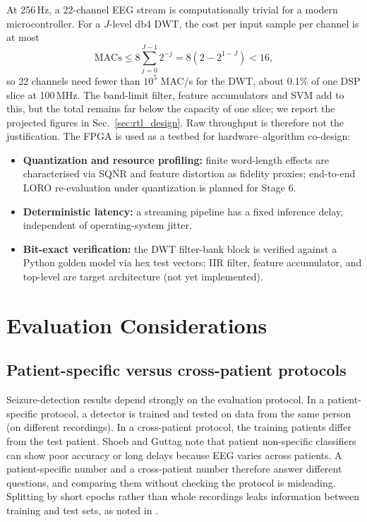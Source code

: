 \documentclass[10pt,twocolumn,letterpaper]{article}
\begin{document}
At 256\,Hz, a 22-channel EEG stream is computationally trivial for a
modern microcontroller. For a $J$-level db4 DWT, the cost per input
sample per channel is at most
\begin{equation}
  \mathrm{MACs} \le 8\sum_{j=0}^{J-1} 2^{-j} = 8\left(2-2^{1-J}\right) < 16,
  \label{eq:macs}
\end{equation}
so 22 channels need fewer than $10^{5}$ MAC/s for the DWT, about 0.1\%
of one DSP slice at 100\,MHz. The band-limit filter, feature
accumulators and SVM add to this, but the total remains far below the
capacity of one slice; we report the projected figures in Sec.~\ref{sec:rtl_design}. Raw
throughput is therefore not the justification. The FPGA is used as a
testbed for hardware--algorithm co-design:
\begin{itemize}
  \item \textbf{Quantization and resource profiling:} finite word-length
    effects are characterised via SQNR and feature distortion as fidelity proxies;
    end-to-end LORO re-evaluation under quantization is planned for Stage 6.
  \item \textbf{Deterministic latency:} a streaming pipeline has a fixed
    inference delay, independent of operating-system jitter.
  \item \textbf{Bit-exact verification:} the DWT filter-bank block is
    verified against a Python golden model via hex test vectors; IIR filter,
    feature accumulator, and top-level are target architecture (not yet implemented).
\end{itemize}

\section{Evaluation Considerations}
\label{sec:eval}

\subsection{Patient-specific versus cross-patient protocols}
\label{sec:protocol}

Seizure-detection results depend strongly on the evaluation protocol. In
a patient-specific protocol, a detector is trained and tested on data
from the same person (on different recordings). In a cross-patient protocol, the training patients differ from
the test patient. Shoeb and Guttag \cite{shoeb2010icml} note that
patient non-specific classifiers can show poor accuracy or long delays
because EEG varies across patients. A patient-specific number and a cross-patient number therefore
answer different questions, and comparing them without checking the
protocol is misleading. Splitting by short epochs rather than whole
recordings leaks information between training and test sets, as
noted in \cite{shoeb2010icml}.
\end{document}
